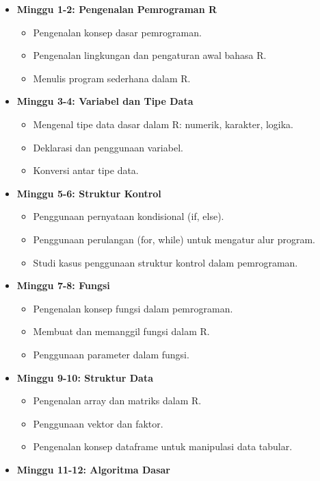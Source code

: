 \documentclass[
]{book}
\providecommand{\tightlist}{%
  \setlength{\itemsep}{0pt}\setlength{\parskip}{0pt}}
\theoremstyle{definition}
\theoremstyle{definition}
\theoremstyle{definition}
\theoremstyle{definition}
\theoremstyle{remark}
\begin{document}
\begin{itemize}
\tightlist
\item
  \textbf{Minggu 1-2: Pengenalan Pemrograman R}

  \begin{itemize}
  \tightlist
  \item
    Pengenalan konsep dasar pemrograman.
  \item
    Pengenalan lingkungan dan pengaturan awal bahasa R.
  \item
    Menulis program sederhana dalam R.
  \end{itemize}
\item
  \textbf{Minggu 3-4: Variabel dan Tipe Data}

  \begin{itemize}
  \tightlist
  \item
    Mengenal tipe data dasar dalam R: numerik, karakter, logika.
  \item
    Deklarasi dan penggunaan variabel.
  \item
    Konversi antar tipe data.
  \end{itemize}
\item
  \textbf{Minggu 5-6: Struktur Kontrol}

  \begin{itemize}
  \tightlist
  \item
    Penggunaan pernyataan kondisional (if, else).
  \item
    Penggunaan perulangan (for, while) untuk mengatur alur program.
  \item
    Studi kasus penggunaan struktur kontrol dalam pemrograman.
  \end{itemize}
\item
  \textbf{Minggu 7-8: Fungsi}

  \begin{itemize}
  \tightlist
  \item
    Pengenalan konsep fungsi dalam pemrograman.
  \item
    Membuat dan memanggil fungsi dalam R.
  \item
    Penggunaan parameter dalam fungsi.
  \end{itemize}
\item
  \textbf{Minggu 9-10: Struktur Data}

  \begin{itemize}
  \tightlist
  \item
    Pengenalan array dan matriks dalam R.
  \item
    Penggunaan vektor dan faktor.
  \item
    Pengenalan konsep dataframe untuk manipulasi data tabular.
  \end{itemize}
\item
  \textbf{Minggu 11-12: Algoritma Dasar}


\end{itemize}
\end{document}
